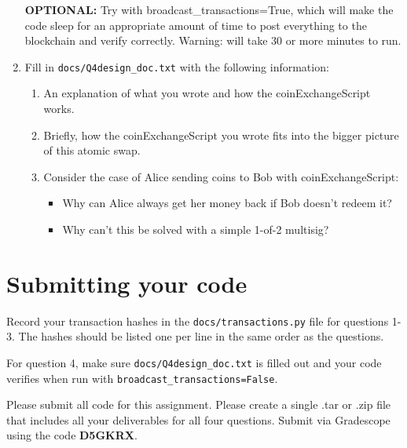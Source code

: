 \documentclass[11pt]{article}
\newenvironment{problems}
{\begin{enumerate}[label=\bfseries Exercise \arabic*.,align=left]}
{\end{enumerate}}
\begin{document}
\begin{problems}
\begin{enumerate}
    	\textbf{OPTIONAL:} Try with broadcast\_transactions=True, which will make the code sleep for an appropriate amount of time to post everything to the blockchain and verify correctly. Warning: will take 30 or more minutes to run.
    \item Fill in \texttt{docs/Q4design\_doc.txt} with the following information:
        \begin{enumerate}
            \item An explanation of what you wrote and how the coinExchangeScript works.
            \item Briefly, how the coinExchangeScript you wrote fits into the bigger
            picture of this atomic swap.
            \item Consider the case of Alice sending coins to Bob with coinExchangeScript:
                \begin{itemize}
                    \item Why can Alice always get her money back if Bob doesn't redeem it?
                    \item Why can't this be solved with a simple 1-of-2 multisig?
                \end{itemize}
            
        \end{enumerate}

    \end{enumerate}
\end{problems}

\section{Submitting your code}
Record your transaction hashes in the \texttt{docs/transactions.py} file for questions 1-3. The hashes should be listed one per line in the same order as the questions.

For question 4, make sure \texttt{docs/Q4design\_doc.txt} is filled out and your code verifies when run with \texttt{broadcast\_transactions=False}.

Please submit all code for this assignment. Please create a single .tar or .zip file that includes all your deliverables for all four questions. Submit via Gradescope using the code {\bf D5GKRX}.
\end{document}
